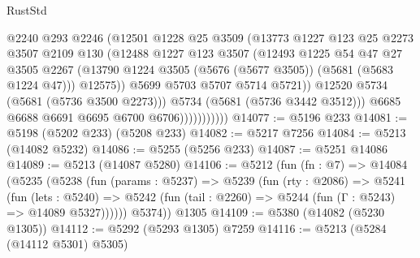 \begin{lexlean}{RustStd}
\begin{coremodule}
                              @2240
                              @293
                              @2246
                              (@12501
                                @1228
                                @25
                                @3509
                                (@13773
                                  @1227
                                  @123
                                  @25
                                  @2273
                                  @3507
                                  @2109
                                  @130
                                  (@12488
                                    @1227
                                    @123
                                    @3507
                                    (@12493
                                      @1225
                                      @54
                                      @47
                                      @27
                                      @3505
                                      @2267
                                      (@13790
                                        @1224
                                        @3505
                                        (@5676 (@5677 @3505))
                                        (@5681 (@5683 @1224 @47)))
                                      @12575))
                                  @5699
                                  @5703
                                  @5707
                                  @5714
                                  @5721))
                              @12520
                              @5734
                              (@5681 (@5736 @3500 @2273)))
                            @5734
                            (@5681 (@5736 @3442 @3512)))
                          @6685
                          @6688
                          @6691
                          @6695
                          @6700
                          @6706)))))))))))
@14077 := @5196 @233
@14081 := @5198 (@5202 @233) (@5208 @233)
@14082 := @5217 @7256
@14084 := @5213 (@14082 @5232)
@14086 := @5255 (@5256 @233)
@14087 := @5251 @14086
@14089 := @5213 (@14087 @5280)
@14106 := @5212
    (fun (fn : @7) =>
    @14084
      (@5235
        (@5238
          (fun (params : @5237) =>
          @5239
            (fun (rty : @2086) =>
            @5241
              (fun (lets : @5240) =>
              @5242 (fun (tail : @2260) => @5244 (fun (Γ : @5243) => @14089 @5327))))))
        @5374))
    @1305
@14109 := @5380 (@14082 (@5230 @1305))
@14112 := @5292 (@5293 @1305) @7259
@14116 := @5213 (@5284 (@14112 @5301) @5305)

\end{coremodule}
\end{lexlean}
